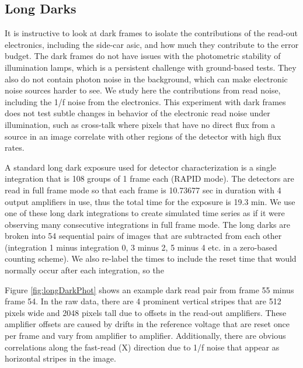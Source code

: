 \documentclass{aastex62}
\begin{document}
\subsection{Long Darks}\label{sec:longDarks}

It is instructive to look at dark frames to isolate the contributions of the read-out electronics, including the side-car asic, and how much they contribute to the error budget.
The dark frames do not have issues with the photometric stability of illumination lamps, which is a persistent challenge with ground-based tests.
They also do not contain photon noise in the background, which can make electronic noise sources harder to see.
We study here the contributions from read noise, including the 1/f noise from the electronics.
This experiment with dark frames does not test subtle changes in behavior of the electronic read noise under illumination, such as cross-talk where pixels that have no direct flux from a source in an image correlate with other regions of the detector with high flux rates.

A standard long dark exposure used for detector characterization is a single integration that is 108 groups of 1 frame each (RAPID mode).
The detectors are read in full frame mode so that each frame is 10.73677 sec in duration with 4 output amplifiers in use, thus the total time for the exposure is 19.3 min.
We use one of these long dark integrations to create simulated time series as if it were observing many consecutive integrations in full frame mode.
The long darks are broken into 54 sequential pairs of images that are subtracted from each other (integration 1 minus integration 0, 3 minus 2, 5 minus 4 etc. in a zero-based counting scheme).
We also re-label the times to include the reset time that would normally occur after each integration, so the 

Figure \ref{fig:longDarkPhot} shows an example dark read pair from frame 55 minus frame 54.
In the raw data, there are 4 prominent vertical stripes that are 512 pixels wide and 2048 pixels tall due to offsets in the read-out amplifiers.
These amplifier offsets are caused by drifts in the reference voltage that are reset once per frame and vary from amplifier to amplifier.
Additionally, there are obvious correlations along the fast-read (X) direction due to 1/f noise that appear as horizontal stripes in the image.
\end{document}
